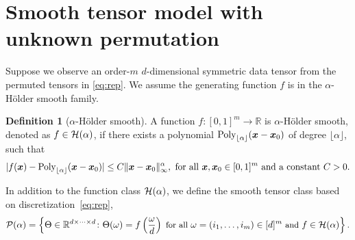 \documentclass{article}
\theoremstyle{definition}
\newtheorem{defn}{Definition}
\begin{document}
\section{Smooth tensor model with unknown permutation}\label{sec:md}
\vspace{-.1cm}
Suppose we observe an order-$m$ $d$-dimensional symmetric data tensor from the permuted tensors in \eqref{eq:rep}.
We assume the generating function $f$ is in the $\alpha$-H\"older smooth family. 
\begin{defn}[$\alpha$-H\"older smooth]
A function $f\colon [0,1]^m\rightarrow \mathbb{R}$ is $\alpha$-H\"older smooth, denoted as $f\in\mathcal{H}(\alpha)$, if there exists a polynomial $\text{Poly}_{\lfloor \alpha\rfloor}(\bm x-\bm x_0)$ of degree  $\lfloor \alpha\rfloor$, such that 
\begin{align}\label{eq:defn}
    |f(\bm x) - \text{Poly}_{\lfloor \alpha\rfloor}(\bm x-\bm x_0)| \leq C\|\bm x-\bm x_0\|_\infty^\alpha, \text{ for all $\bm x,\bm x_0\in [0,1]^m$ and a constant $C>0.$}
\end{align}
\end{defn}

In addition to the function class $\mathcal{H}(\alpha)$, we define the smooth tensor class based on discretization~\eqref{eq:rep}, 
\begin{equation}\label{eq:function}
{\small \tP(\alpha)= \left\{\Theta\in\mathbb{R}^{d\times \cdots \times d} \colon\Theta(\omega) = f\left({\omega \over d}\right) \text{ for all } \omega=(i_1,\ldots,i_m) \in[d]^m \text{ and } f\in\tH(\alpha)\right\}.}
\end{equation}
\end{document}
